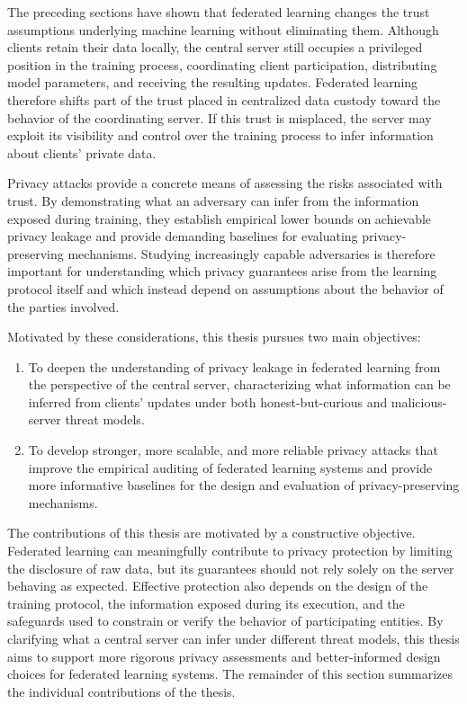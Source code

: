 The preceding sections have shown that federated learning changes the trust assumptions underlying machine learning without eliminating them. Although clients retain their data locally, the central server still occupies a privileged position in the training process, coordinating client participation, distributing model parameters, and receiving the resulting updates. Federated learning therefore shifts part of the trust placed in centralized data custody toward the behavior of the coordinating server. If this trust is misplaced, the server may exploit its visibility and control over the training process to infer information about clients' private data. 

Privacy attacks provide a concrete means of assessing the risks associated with trust. By demonstrating what an adversary can infer from the information exposed during training, they establish empirical lower bounds on achievable privacy leakage and provide demanding baselines for evaluating privacy-preserving mechanisms. Studying increasingly capable adversaries is therefore important for understanding which privacy guarantees arise from the learning protocol itself and which instead depend on assumptions about the behavior of the parties involved.


Motivated by these considerations, this thesis pursues two main objectives:
\begin{enumerate}
    \item To deepen the understanding of privacy leakage in federated learning
    from the perspective of the central server, characterizing what information
    can be inferred from clients' updates under both honest-but-curious and
    malicious-server threat models.

    \item To develop stronger, more scalable, and more reliable privacy attacks
    that improve the empirical auditing of federated learning systems and
    provide more informative baselines for the design and evaluation of
    privacy-preserving mechanisms.
\end{enumerate}

The contributions of this thesis are motivated by a constructive objective. Federated learning can meaningfully contribute to privacy protection by limiting the disclosure of raw data, but its guarantees should not rely solely on the server behaving as expected. Effective protection also depends on the design of the training protocol, the information exposed during its execution, and the safeguards used to constrain or verify the behavior of participating entities. By clarifying what a central server can infer under different threat models, this thesis aims to support more rigorous privacy assessments and better-informed design choices for federated learning systems. The remainder of this section summarizes the individual contributions of the thesis.


